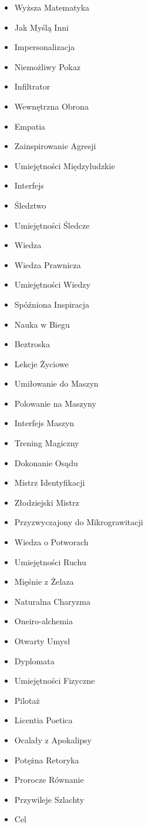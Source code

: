 \begin{itemize}
\item Wyższa Matematyka
\item Jak Myślą Inni
\item Impersonalizacja
\item Niemożliwy Pokaz
\item Infiltrator
\item Wewnętrzna Obrona
\item Empatia
\item Zainspirowanie Agresji
\item Umiejętności Międzyludzkie
\item Interfejs
\item Śledztwo
\item Umiejętności Śledcze
\item Wiedza
\item Wiedza Prawnicza
\item Umiejętności Wiedzy
\item Spóźniona Inspiracja
\item Nauka w Biegu
\item Beztroska
\item Lekcje Życiowe
\item Umiłowanie do Maszyn
\item Polowanie na Maszyny
\item Interfejs Maszyn
\item Trening Magiczny
\item Dokonanie Osądu
\item Mistrz Identyfikacji
\item Złodziejski Mistrz
\item Przyzwyczajony do Mikrograwitacji
\item Wiedza o Potworach
\item Umiejętności Ruchu
\item Mięśnie z Żelaza
\item Naturalna Charyzma
\item Oneiro-alchemia
\item Otwarty Umysł
\item Dyplomata
\item Umiejętności Fizyczne
\item Pilotaż
\item Licentia Poetica
\item Ocalały z Apokalipsy
\item Potężna Retoryka
\item Prorocze Równanie
\item Przywileje Szlachty
\item Cel

\end{itemize}
